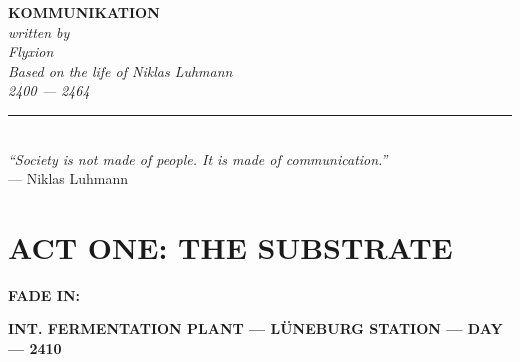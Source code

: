 \documentclass[12pt]{article}
\newcommand{\sceneheading}[1]{%
  \vspace{10pt}%
  \noindent\textbf{#1}%
  \vspace{6pt}%
}
\begin{document}

\begin{titlepage}
\vspace*{2in}
\begin{center}
{\LARGE\bfseries KOMMUNIKATION}\\[1.5em]
{\large\itshape written by}\\[0.5em]
{\large\itshape Flyxion}\\[2em]
{\normalsize\itshape Based on the life of Niklas Luhmann}\\[0.5em]
{\normalsize\itshape 2400 — 2464}\\[3em]
\rule{3in}{0.4pt}\\[1em]
{\itshape ``Society is not made of people. It is made of communication.''}\\[0.3em]
{\small — Niklas Luhmann}
\end{center}
\end{titlepage}

\newpage


\section*{ACT ONE: THE SUBSTRATE}

\textbf{FADE IN:}

\bigskip

\sceneheading{INT. FERMENTATION PLANT — LÜNEBURG STATION — DAY — 2410}
\end{document}
